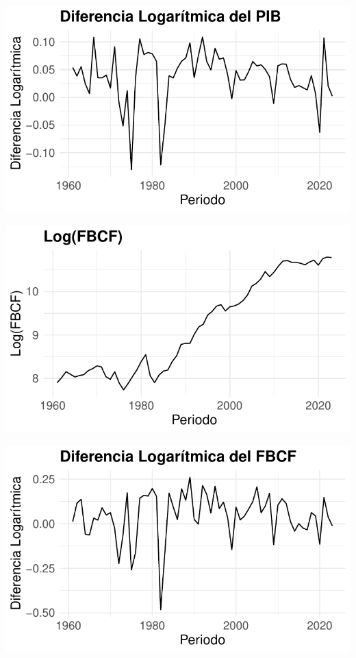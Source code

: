 \documentclass[
  12pt,
]{article}
\begin{document}
\begin{center}\includegraphics{ensayo_files/figure-latex/unnamed-chunk-6-1} \end{center}

\begin{center}\includegraphics{ensayo_files/figure-latex/unnamed-chunk-7-1} \end{center}

\begin{center}\includegraphics{ensayo_files/figure-latex/unnamed-chunk-8-1} \end{center}
\end{document}
